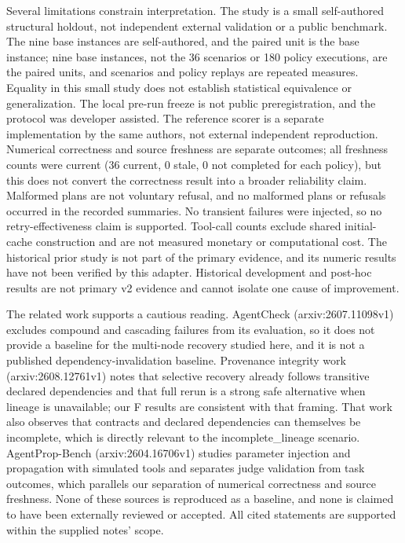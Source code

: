 \documentclass{article}
\begin{document}
Several limitations constrain interpretation. The study is a small self-authored structural holdout, not independent external validation or a public benchmark. The nine base instances are self-authored, and the paired unit is the base instance; nine base instances, not the 36 scenarios or 180 policy executions, are the paired units, and scenarios and policy replays are repeated measures. Equality in this small study does not establish statistical equivalence or generalization. The local pre-run freeze is not public preregistration, and the protocol was developer assisted. The reference scorer is a separate implementation by the same authors, not external independent reproduction. Numerical correctness and source freshness are separate outcomes; all freshness counts were current (36 current, 0 stale, 0 not completed for each policy), but this does not convert the correctness result into a broader reliability claim. Malformed plans are not voluntary refusal, and no malformed plans or refusals occurred in the recorded summaries. No transient failures were injected, so no retry-effectiveness claim is supported. Tool-call counts exclude shared initial-cache construction and are not measured monetary or computational cost. The historical prior study is not part of the primary evidence, and its numeric results have not been verified by this adapter. Historical development and post-hoc results are not primary v2 evidence and cannot isolate one cause of improvement.

The related work supports a cautious reading. AgentCheck (arxiv:2607.11098v1) excludes compound and cascading failures from its evaluation, so it does not provide a baseline for the multi-node recovery studied here, and it is not a published dependency-invalidation baseline. Provenance integrity work (arxiv:2608.12761v1) notes that selective recovery already follows transitive declared dependencies and that full rerun is a strong safe alternative when lineage is unavailable; our F results are consistent with that framing. That work also observes that contracts and declared dependencies can themselves be incomplete, which is directly relevant to the incomplete\_lineage scenario. AgentProp-Bench (arxiv:2604.16706v1) studies parameter injection and propagation with simulated tools and separates judge validation from task outcomes, which parallels our separation of numerical correctness and source freshness. None of these sources is reproduced as a baseline, and none is claimed to have been externally reviewed or accepted. All cited statements are supported within the supplied notes' scope.
\end{document}
